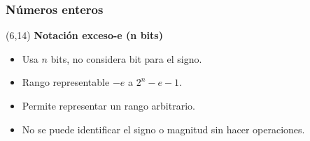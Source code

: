 \documentclass[aspectratio=169]{beamer}
\begin{document}
\begin{frame}[fragile]
    \frametitle{Números enteros}
    \begin{textblock}{90}(6,14)
    \textbf{Notación exceso-e (n bits)}
    \begin{itemize}
    \item Usa $n$ bits, no considera bit para el signo.
    \item Rango representable $-e$ a $2^{n}-e-1$.
    \item Permite representar un rango arbitrario.
    \item No se puede identificar el signo o magnitud sin hacer operaciones.
    \end{itemize}
    
    \end{textblock}
    

\end{frame}
\end{document}
